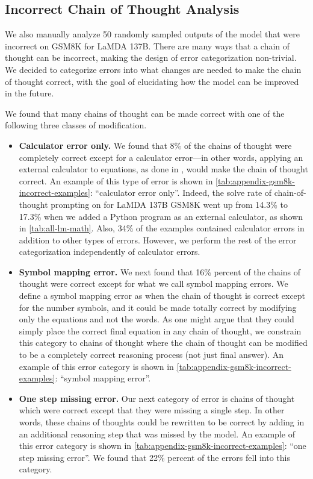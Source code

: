 \documentclass[]{article}
\theoremstyle{plain}
\theoremstyle{definition}
\theoremstyle{remark}
\newcommand{\lamda}[0]{LaMDA}
\begin{document}


\clearpage
\subsection{Incorrect Chain of Thought Analysis}\label{subsec:incorrect-chain-of-thought-analysis}
We also manually analyze 50 randomly sampled outputs of the model that were incorrect on GSM8K for \lamda{} 137B. 
There are many ways that a chain of thought can be incorrect, making the design of error categorization non-trivial.
We decided to categorize errors into what changes are needed to make the chain of thought correct, with the goal of elucidating how the model can be improved in the future.

We found that many chains of thought can be made correct with one of the following three classes of modification.

\begin{itemize}[leftmargin=*,topsep=0pt]
    \itemsep0em 
    \item \textbf{Calculator error only.} We found that 8\% of the chains of thought were completely correct except for a calculator error---in other words, applying an external calculator to equations, as done in \citet{cobbe2021training}, would make the chain of thought correct. An example of this type of error is shown in \cref{tab:appendix-gsm8k-incorrect-examples}: ``calculator error only''. Indeed, the solve rate of chain-of-thought prompting on for \lamda{} 137B GSM8K went up from 14.3\% to 17.3\% when we added a Python program as an external calculator, as shown in \cref{tab:all-lm-math}. 
    Also, 34\% of the examples contained calculator errors in addition to other types of errors. However, we perform the rest of the error categorization independently of calculator errors.
    \item \textbf{Symbol mapping error.} We next found that 16\% percent of the chains of thought were correct except for what we call symbol mapping errors. We define a symbol mapping error as when the chain of thought is correct except for the number symbols, and it could be made totally correct by modifying only the equations and not the words. 
    As one might argue that they could simply place the correct final equation in any chain of thought, we constrain this category to chains of thought where the chain of thought can be modified to be a completely correct reasoning process (not just final answer). An example of this error category is shown in \cref{tab:appendix-gsm8k-incorrect-examples}: ``symbol mapping error''.
    \item \textbf{One step missing error.} Our next category of error is chains of thought which were correct except that they were missing a single step. In other words, these chains of thoughts could be rewritten to be correct by adding in an additional reasoning step that was missed by the model. An example of this error category is shown in \cref{tab:appendix-gsm8k-incorrect-examples}: ``one step missing error''. We found that 22\% percent of the errors fell into this category.
\end{itemize}
\end{document}
